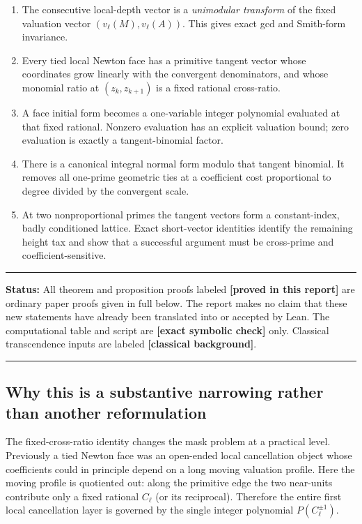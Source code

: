 \documentclass[11pt,oneside]{article}
\theoremstyle{definition}
\theoremstyle{remark}
\newcommand{\provedhere}{\textcolor{proofgreen}{\textbf{[proved in this report]}}}
\newcommand{\exactcheck}{\textcolor{exactviolet}{\textbf{[exact symbolic check]}}}
\newcommand{\knownstatus}{\textcolor{contextgray}{\textbf{[classical background]}}}
\newenvironment{statusbox}[1]
{\begin{center}\begin{minipage}{0.94\textwidth}\raggedright\hrule\vspace{0.45em}\textbf{Status:} #1\par\vspace{0.35em}}
{\vspace{0.35em}\hrule\end{minipage}\end{center}}
\begin{document}
\begin{enumerate}
\item The consecutive local-depth vector is a \emph{unimodular transform} of the fixed
valuation vector $(v_\ell(M),v_\ell(A))$.  This gives exact gcd and Smith-form invariance.
\item Every tied local Newton face has a primitive tangent vector whose coordinates grow
linearly with the convergent denominators, and whose monomial ratio at $(z_k,z_{k+1})$ is a
fixed rational cross-ratio.
\item A face initial form becomes a one-variable integer polynomial evaluated at that fixed
rational.  Nonzero evaluation has an explicit valuation bound; zero evaluation is exactly a
tangent-binomial factor.
\item There is a canonical integral normal form modulo that tangent binomial.  It removes all
one-prime geometric ties at a coefficient cost proportional to degree divided by the
convergent scale.
\item At two nonproportional primes the tangent vectors form a constant-index, badly
conditioned lattice.  Exact short-vector identities identify the remaining height tax and
show that a successful argument must be cross-prime and coefficient-sensitive.
\end{enumerate}

\begin{statusbox}{All theorem and proposition proofs labeled \provedhere{} are ordinary
paper proofs given in full below.  The report makes no claim that these new statements have
already been translated into or accepted by Lean.  The computational table and script are
\exactcheck{} only.  Classical transcendence inputs are labeled \knownstatus{}.}
\end{statusbox}

\subsection{Why this is a substantive narrowing rather than another reformulation}

The fixed-cross-ratio identity changes the mask problem at a practical level.  Previously a
tied Newton face was an open-ended local cancellation object whose coefficients could in
principle depend on a long moving valuation profile.  Here the moving profile is quotiented
out: along the primitive edge the two near-units contribute only a fixed rational $C_\ell$
(or its reciprocal).  Therefore the entire first local cancellation layer is governed by the
single integer polynomial $P(C_\ell^{\pm1})$.
\end{document}
